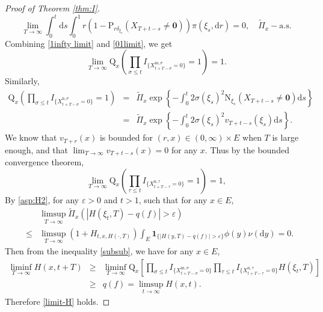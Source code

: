 \documentclass[12pt,a4paper]{amsart}
\numberwithin{equation}{section}
\theoremstyle{plain}
\theoremstyle{definition}
\theoremstyle{remark}
\begin{document}
\begin{proof}[Proof of Theorem \ref{thm:I}]
\begin{equation}
\lim_{T\rightarrow\infty}\int_0^t\mathrm ds\int_0^1 r(1-\mathrm P_{r\delta_{\xi_s}}(X_{T+t-s}\neq \mathbf 0))\pi(\xi_s,\mathrm dr)=0, \quad \widetilde\Pi_x-\mbox{a.s.}
\end{equation}
 Combining \eqref{1infty limit} and \eqref{01limit}, we get
\[
\lim_{T\rightarrow\infty}\mathrm Q_{x}\left(\prod_{\sigma\leq t}I_{\{ X_{t+T-\sigma}^{{\mathrm m},\sigma}=0\}}=1\right)=1.
\]
Similarly,
\begin{eqnarray*}
\mathrm Q_x\left(\prod_{\sigma\leq t}I_{\{ X_{t+T-\sigma}^{{\mathrm n},\sigma}=0\}}=1\right)
&=&\widetilde\Pi_x\exp\left\{-\int_0^t2\sigma(\xi_s)^2\mathrm N_{\xi_s}(X_{T+t-s}\neq \mathbf 0)\mathrm ds\right\}\\
&=&\widetilde\Pi_x\exp\left\{-\int_0^t2\sigma(\xi_s)^2v_{T+t-s}(\xi_s)\mathrm ds\right\}.
\end{eqnarray*}
We know that $v_{T+r}(x)$ is  bounded for $(r,x)\in (0,\infty)\times E$ when $T$ is large enough, and that  $\lim_{T\rightarrow\infty} v_{T+t-s}(x)=0$ for any $x$.  Thus by the bounded convergence theorem,
\[
\lim_{T\rightarrow\infty}\mathrm Q_x\left(\prod_{\tau\leq t}I_{\{ X_{t+T-\tau}^{{\mathrm n},\tau}=0\}}=1\right)=1,
\]
By \eqref{asp:H2},
for any $\varepsilon>0$ and $t>1$,
such that for any $x\in E$,
\begin{eqnarray*}
&&\limsup_{T\rightarrow\infty}\widetilde\Pi_x\left(|H(\xi_t, T)-q(f)|>\varepsilon\right)\\
&\leq& \limsup_{T\rightarrow\infty}(1+H_{t, x, H(\cdot, T)})\int_E\mathbf 1_{\{|H(y, T)-q(f)|>\varepsilon\}}\phi(y)\nu(\mathrm dy)=0.
\end{eqnarray*}
Then from the inequality \eqref{subsub}, we have for any $x\in E$,
\begin{eqnarray*}
\liminf_{T\rightarrow\infty}H(x, t+T)&\geq&  \liminf_{T\rightarrow\infty} \mathrm Q_x\left[\prod_{\sigma\leq t}I_{\{ X_{t+T-\sigma}^{{\mathrm m},\sigma}=0\}}\prod_{\tau\leq t}I_{\{ X_{t+T-\tau}^{{\mathrm n},\tau}=0\}}H(\xi_t, T)\right]\\
&\geq& q(f)=\limsup_{t\rightarrow\infty}H(x, t).
\end{eqnarray*}
 Therefore \eqref{limit-H} holds.


\end{proof}
\end{document}
